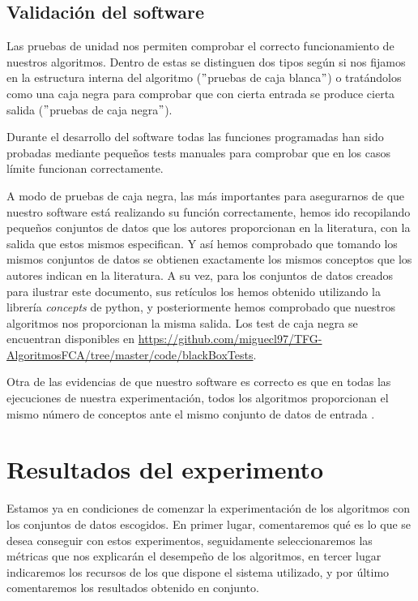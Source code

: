\documentclass[oneside,openright,titlepage,numbers=noenddot,openany,headinclude,footinclude=true,
cleardoublepage=empty,abstractoff,BCOR=5mm,paper=a4,fontsize=12pt,main=spanish]{scrreprt}
\begin{document}
\section{Validación del software}

Las pruebas de unidad nos permiten comprobar el correcto funcionamiento de nuestros algoritmos. Dentro de estas se distinguen dos tipos según si nos fijamos en la estructura interna del  algoritmo ($"$pruebas de caja blanca$"$) o tratándolos como una caja negra para comprobar que con cierta entrada se produce cierta salida ($"$pruebas de caja negra$"$).

Durante el desarrollo del software todas las funciones programadas han sido probadas mediante pequeños tests manuales para comprobar que en los casos límite funcionan correctamente.

A modo de pruebas de caja negra, las más importantes para asegurarnos de que nuestro software está realizando su función correctamente, hemos ido recopilando pequeños conjuntos de datos que los autores proporcionan en la literatura, con la salida que estos mismos especifican. Y así hemos comprobado que tomando los mismos conjuntos de datos se obtienen exactamente los mismos conceptos que los autores indican en la literatura. A su vez, para los conjuntos de datos creados para ilustrar este documento, sus retículos los hemos obtenido utilizando la librería \textit{concepts} de python, y posteriormente hemos comprobado que nuestros algoritmos nos proporcionan la misma salida. Los test de caja negra se encuentran disponibles en \href{https://github.com/miguecl97/TFG-AlgoritmosFCA/tree/master/code/blackBoxTests}{https://github.com/miguecl97/TFG-AlgoritmosFCA/tree/master/code/blackBoxTe\linebreak sts}.

Otra de las evidencias de que nuestro software es correcto es que en todas las ejecuciones de nuestra experimentación, todos los algoritmos proporcionan el mismo número de conceptos ante el mismo conjunto de datos de entrada .

\chapter{Resultados del experimento}
   \label{chap:7}
Estamos ya en condiciones de comenzar la experimentación de los algoritmos con los conjuntos de datos escogidos. En primer lugar, comentaremos qué es lo que se desea conseguir con estos experimentos, seguidamente seleccionaremos las métricas que nos explicarán el desempeño de los algoritmos, en tercer lugar indicaremos los recursos de los que dispone el sistema utilizado, y por último comentaremos los resultados obtenido en conjunto.
\end{document}
